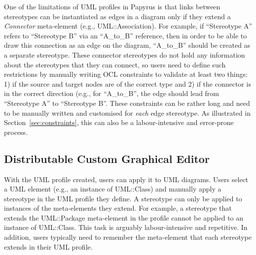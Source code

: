 One of the limitations of UML profiles in Papyrus is that links between stereotypes can be instantiated as edges in a diagram only if they extend a \textit{Connector} meta-element (e.g., UML::Association).  
For example, if ``Stereotype A'' refers to ``Stereotype B'' via an ``A\_to\_B'' reference, then in order to be able to draw this connection as an edge on the diagram, ``A\_to\_B'' should be created as a separate stereotype. 
These connector stereotypes do not hold any information about the stereotypes that they can connect, so users need to define such restrictions by manually writing OCL constraints to validate at least two things: 1) if the source and target nodes are of the correct type and 2) if the connector is in the correct direction (e.g., for ``A\_to\_B'', the edge should lead from ``Stereotype A'' to ``Stereotype B''. 
These constraints can be rather long and need to be manually written and customised for \textit{each} edge stereotype. As illustrated in Section~\ref{sec:constraints}, this can also be a labour-intensive and error-prone process.

\subsection{Distributable Custom Graphical Editor}
With the UML profile created, users can apply it to UML diagrams. 
Users select a UML element (e.g., an instance of UML::Class) and manually apply a stereotype in the UML profile they define. 
A stereotype can only be applied to instances of the meta-elements they extend.
For example, a stereotype that extends the UML::Package meta-element in the profile cannot be applied to an instance of UML::Class. 
This task is arguably labour-intensive and repetitive. 
In addition, users typically need to remember the meta-element that each stereotype extends in their UML profile. 

